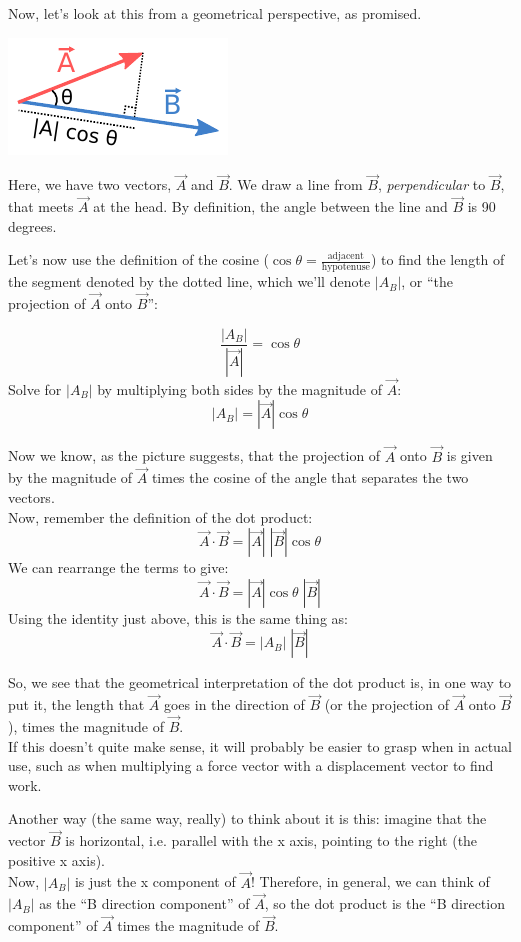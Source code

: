 \documentclass[12pt,a4paper]{report}
\begin{document}
Now, let's look at this from a geometrical perspective, as promised.

\includegraphics[scale=1.7]{Graphics/vectors/vectordot}

Here, we have two vectors, $\vec{A}$ and $\vec{B}$. We draw a line from $\vec{B}$, \emph{perpendicular} to $\vec{B}$, that meets $\vec{A}$ at the head. By definition, the angle between the line and $\vec{B}$ is 90 degrees.

Let's now use the definition of the cosine ($\displaystyle \cos \theta = \frac{\text{adjacent}}{\text{hypotenuse}}$) to find the length of the segment denoted by the dotted line, which we'll denote $|A_B|$, or ``the projection of $\vec{A}$ onto $\vec{B}$'':

\[ \frac{|A_B|}{|\vec{A}|} = \cos{\theta} \]
Solve for $|A_B|$ by multiplying both sides by the magnitude of $\vec{A}$:
\[ |A_B| = |\vec{A}| \cos{\theta} \]

Now we know, as the picture suggests, that the projection of $\vec{A}$ onto $\vec{B}$ is given by the magnitude of $\vec{A}$ times the cosine of the angle that separates the two vectors.\\
Now, remember the definition of the dot product:
\[ \vec{A} \cdot \vec{B} = |\vec{A}| \; |\vec{B}| \cos{\theta} \]
We can rearrange the terms to give:
\[ \vec{A} \cdot \vec{B} = |\vec{A}| \cos{\theta} \; |\vec{B}|\]
Using the identity just above, this is the same thing as:
\[ \vec{A} \cdot \vec{B} = |A_B| \; |\vec{B}|\]

So, we see that the geometrical interpretation of the dot product is, in one way to put it, the length that $\vec{A}$ goes in the direction of $\vec{B}$ (or the projection of $\vec{A}$ onto $\vec{B}$), times the magnitude of $\vec{B}$.\\
If this doesn't quite make sense, it will probably be easier to grasp when in actual use, such as when multiplying a force vector with a displacement vector to find work.

Another way (the same way, really) to think about it is this: imagine that the vector $\vec{B}$ is horizontal, i.e. parallel with the x axis, pointing to the right (the positive x axis).\\
Now, $|A_B|$ is just the x component of $\vec{A}$! Therefore, in general, we can think of $|A_B|$ as the ``B direction component'' of $\vec{A}$, so the dot product is the ``B direction component'' of $\vec{A}$ times the magnitude of $\vec{B}$.
\end{document}
